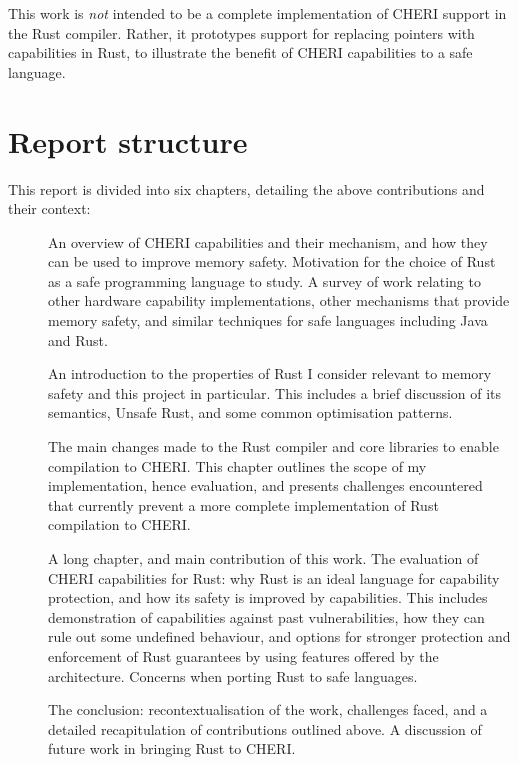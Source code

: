 \documentclass[dissertation.tex]{subfiles}
\begin{document}
This work is \emph{not} intended to be a complete implementation of
CHERI support in the Rust compiler.
Rather, it prototypes support for replacing pointers with capabilities
in Rust, to illustrate the benefit of CHERI capabilities to a safe
language.


\section{Report structure}
This report is divided into six chapters, detailing the above
contributions and their context:

\begin{description}
    \item[]
    An overview of CHERI capabilities and their mechanism, and how they
    can be used to improve memory safety.
    Motivation for the choice of Rust as a safe programming language to
    study.
    A survey of work relating to other hardware capability
    implementations, other mechanisms that provide memory safety, and
    similar techniques for safe languages including Java and Rust.
    \item[]
    An introduction to the properties of Rust I consider relevant to
    memory safety and this project in particular.
    This includes a brief discussion of its semantics, Unsafe Rust, and
    some common optimisation patterns.
    \item[]
    The main changes made to the Rust compiler and core libraries to
    enable compilation to CHERI.
    This chapter outlines the scope of my implementation, hence
    evaluation, and presents challenges encountered that currently
    prevent a more complete implementation of Rust compilation to CHERI.
    \item[]
    A long chapter, and main contribution of this work.
    The evaluation of CHERI capabilities for Rust: why Rust is an ideal
    language for capability protection, and how its safety is improved
    by capabilities.
    This includes demonstration of capabilities against past
    vulnerabilities, how they can rule out some undefined behaviour, and
    options for stronger protection and enforcement of Rust guarantees
    by using features offered by the architecture.
    Concerns when porting Rust to safe languages.
    \item[]
    The conclusion: recontextualisation of the work, challenges faced,
    and a detailed recapitulation of contributions outlined above.
    A discussion of future work in bringing Rust to CHERI.
\end{description}
\end{document}
